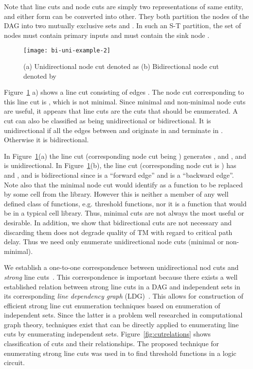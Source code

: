 \documentclass[journal]{IEEEtran}
\begin{document}
Note  that  line cuts and node cuts are simply two representations of same entity, and either form can be converted into other. They both partition the nodes of the DAG into two mutually exclusive sets  and . In such an S-T partition, the set  of nodes must contain primary inputs and   must contain the sink node . 

\begin{figure}[h]
\centering
\texttt{[image: bi-uni-example-2]}
\caption {(a) Unidirectional node cut denoted as  (b) Bidirectional node cut denoted by  }
\label{fig:bi-uni-example}
\end{figure}

Figure~\ref{fig:bi-uni-example} a) shows a line cut consisting of edges . The node cut corresponding to this line cut is , which is not minimal. Since minimal and non-minimal node cuts are useful, it appears that line cuts are the cuts that should be enumerated.  A cut can also be classified as being unidirectional or bidirectional. It is unidirectional if all the edges between  and  originate in  and terminate in . Otherwise it is bidirectional. 

In Figure~\ref{fig:bi-uni-example}(a) the line cut  (corresponding node cut being ) generates , and , and is unidirectional. In Figure~\ref{fig:bi-uni-example}(b), the line cut  (corresponding node cut is ) has  and , and is bidirectional since  is a ``forward edge'' and  is a ``backward edge''.  Note also that the minimal  node cut  would identify  as a function to be replaced by some cell from the library. However this is neither a member of any well defined class of functions, e.g. threshold functions, nor it is a function that would be in a typical cell library.  Thus, minimal cuts are not always the most useful or desirable. In addition, 
we show that bidirectional cuts are not necessary and discarding them does not degrade quality of TM with regard to critical path delay.  
Thus we need only enumerate  unidirectional node cuts (minimal or non-minimal). 

We establish a one-to-one correspondence between unidirectional nod cuts and \textit{strong} line cuts~\cite{kagaris1999maximum}. This correspondence is important because there exists a well established relation between strong line cuts in a DAG and independent sets in its corresponding \emph{line dependency graph} (LDG)~\cite{kagaris1999maximum}. This allows for construction of efficient strong line cut enumeration techniques based on enumeration of independent sets. Since the latter is a problem well researched in computational graph theory, techniques exist that can be directly applied to enumerating line cuts by enumerating independent sets. Figure~\ref{fig:cutrelations} shows classification of cuts and their relationships.
The proposed technique for enumerating strong line cuts was used in \cite{Niranjan2010} to find threshold functions in a logic circuit.
\end{document}
